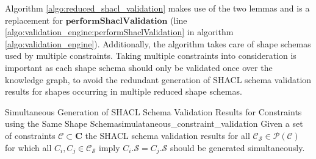 Algorithm \ref{algo:reduced_shacl_validation} makes use of the two lemmas and is a replacement for $\mathbf{performShaclValidation}$ (line \ref{algo:validation_engine:performShaclValidation} in algorithm \ref{algo:validation_engine}). Additionally, the algorithm takes care of shape schemas used by multiple constraints. Taking multiple constraints into consideration is important as each shape schema should only be validated once over the knowledge graph, to avoid the redundant generation of SHACL schema validation results for shapes occurring in multiple reduced shape schemas. 
\begin{Satz}{Simultaneous Generation of SHACL Schema Validation Results for Constraints using the Same Shape Schema}{simulataneous_constraint_validation}
Given a set of constraints $\mathcal{C} \subset \mathbf{C}$ the SHACL schema validation results for all $\mathcal{C}_\mathcal{S} \in \mathcal{P}(\mathcal{C})$ for which all $C_i, C_j \in \mathcal{C}_\mathcal{S}$ imply $C_i.\mathcal{S} = C_j.\mathcal{S}$ should be generated simultaneously. 
\end{Satz}

